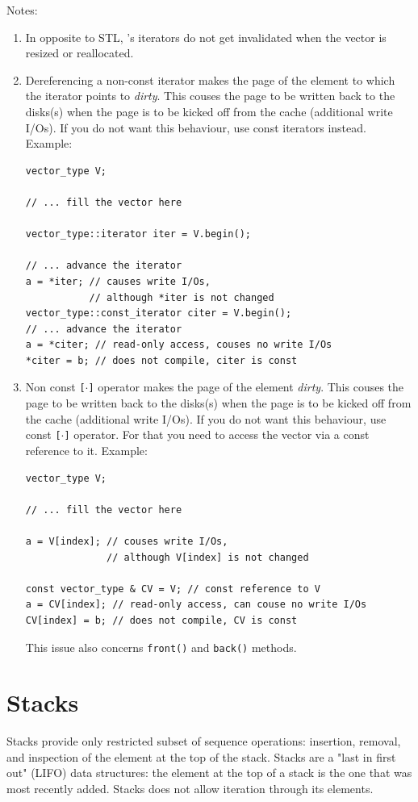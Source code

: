 \documentclass[twoside]{book}
\begin{document}
Notes:
\begin{enumerate}
\item In opposite to STL, \xvector 's iterators do not get invalidated
when the vector is resized or reallocated.
\item Dereferencing a non-const iterator makes the page of the element
to which the iterator points to \emph{dirty}. This couses the page to
be written back to the disks(s) when the page is to be kicked off from
the cache (additional write I/Os). If you do not want this behaviour,
use const iterators instead. Example:
\begin{lstlisting}
vector_type V;

// ... fill the vector here

vector_type::iterator iter = V.begin();

// ... advance the iterator
a = *iter; // causes write I/Os,
           // although *iter is not changed
vector_type::const_iterator citer = V.begin();
// ... advance the iterator
a = *citer; // read-only access, couses no write I/Os
*citer = b; // does not compile, citer is const

\end{lstlisting}
\item Non const \texttt{[$\cdot$]} operator makes the page of the
element \emph{dirty}. This couses the page to
be written back to the disks(s) when the page is to be kicked off from
the cache (additional write I/Os). If you do not want this behaviour,
use const \texttt{[$\cdot$]} operator. For that you need to access the
vector via a const reference to it. Example:
\begin{lstlisting}
vector_type V;

// ... fill the vector here

a = V[index]; // couses write I/Os, 
              // although V[index] is not changed

const vector_type & CV = V; // const reference to V
a = CV[index]; // read-only access, can couse no write I/Os
CV[index] = b; // does not compile, CV is const
\end{lstlisting}
This issue also concerns \texttt{front()} and \texttt{back()} methods.
\end{enumerate}

\newcommand{\xstack}{\texttt{stxxl::stack}}

\section{Stacks}
\label{stacksection}
Stacks provide only restricted subset of
sequence operations: insertion, removal, and inspection of the element
at the top of the stack. Stacks are a "last in first out" (LIFO) data
structures: the element at the top of a stack is the one that was most
recently added. Stacks does not allow iteration through its
elements. 
\end{document}
